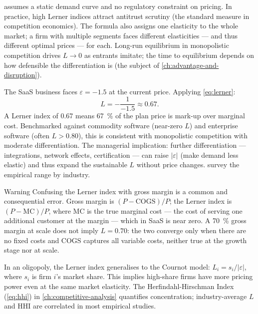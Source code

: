  assumes a static demand curve and no regulatory constraint on pricing. In
practice, high Lerner indices attract antitrust scrutiny (the standard measure in competition
economics). The formula also assigns one elasticity to the whole market; a firm with multiple
segments faces different elasticities --- and thus different optimal prices --- for each.
Long-run equilibrium in monopolistic competition drives \(L\to 0\) as entrants imitate; the
time to equilibrium depends on how defensible the differentiation is (the subject of
\cref{ch:advantage-and-disruption}).

\begin{example}
The SaaS business faces \(\varepsilon=-1.5\) at the current price. Applying \cref{eq:lerner}:
\[
  L = -\frac{1}{-1.5} \approx 0.67.
\]
A Lerner index of \num{0.67} means \qty{67}{\percent} of the  plan price is mark-up over
marginal cost. Benchmarked against commodity software (near-zero \(L\)) and enterprise software
(often \(L>0.80\)), this is consistent with monopolistic competition with moderate differentiation.
The managerial implication: further differentiation --- integrations, network effects, certification
--- can raise \(|\varepsilon|\) (make demand less elastic) and thus expand the sustainable \(L\)
without price changes. \textcite{dranove7theconomics} survey the empirical range by industry.
\end{example}

\begin{admonition}{Warning}
Confusing the Lerner index with gross margin is a common and consequential error. Gross margin
is \((P-\mathrm{COGS})/P\); the Lerner index is \((P-\mathrm{MC})/P\), where \(\mathrm{MC}\) is
the true marginal cost --- the cost of serving one additional customer at the margin --- which in
SaaS is near zero. A \qty{70}{\percent} gross margin at scale does not imply \(L=0.70\): the two
converge only when there are no fixed costs and COGS captures all variable costs, neither true
at the growth stage nor at scale.
\end{admonition}

In an oligopoly, the Lerner index generalises to the Cournot model: \(L_i = s_i / |\varepsilon|\),
where \(s_i\) is firm \(i\)'s market share. This implies high-share firms have more pricing power
even at the same market elasticity. The Herfindahl-Hirschman Index (\cref{eq:hhi}) in
\cref{ch:competitive-analysis} quantifies concentration; industry-average \(L\) and HHI are
correlated in most empirical studies.

